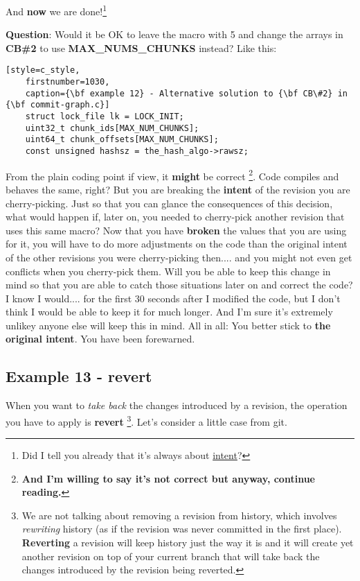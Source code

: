 And {\bf now} we are done!\footnote{Did I tell you already that it's always about \hyperref[intent]{intent}?}

{\bf Question}: Would it be OK to leave the macro with 5 and change the arrays in {\bf CB\#2} to use {\bf MAX\_NUMS\_CHUNKS} instead?
Like this:

\begin{lstlisting}[style=c_style,
	firstnumber=1030,
	caption={\bf example 12} - Alternative solution to {\bf CB\#2} in {\bf commit-graph.c}]
	struct lock_file lk = LOCK_INIT;
	uint32_t chunk_ids[MAX_NUM_CHUNKS];
	uint64_t chunk_offsets[MAX_NUM_CHUNKS];
	const unsigned hashsz = the_hash_algo->rawsz;
\end{lstlisting}

From the plain coding point if view, it {\bf might} be correct
\footnote{\bf And I'm willing to say it's not correct but anyway, continue reading.}.
Code compiles and behaves the same, right? But you are breaking the {\bf intent} of the revision you are cherry-picking. Just so that you
can glance the consequences of this decision, what would happen if, later on, you needed to cherry-pick another revision that uses this
same macro? Now that you have {\bf broken} the values that you are using for it, you will have to do more adjustments on the code than
the original intent of the other revisions you were cherry-picking then.... and you might not even get conflicts when you cherry-pick
them. Will you be able to keep this change in mind so that you are able to catch those situations later on and correct the code?
I know I would.... for the first 30 seconds after I modified the code, but I don't think I would be able to keep it for much longer.
And I'm sure it's extremely unlikey anyone else will keep this in mind. All in all: You better stick to {\bf the original intent}.
You have been forewarned.

\subsection{Example 13 - revert}
\label{example_13}

When you want to {\it take back} the changes introduced by a revision, the operation you have to apply is {\bf revert}
\footnote{We are not talking about removing a revision from history, which involves {\it rewriting} history (as if the revision
was never committed in the first place). {\bf Reverting} a revision will keep history just the way it is and it will create yet
another revision on top of your current branch that will take back the changes introduced by the revision being reverted.}. Let's
consider a little case from git.

